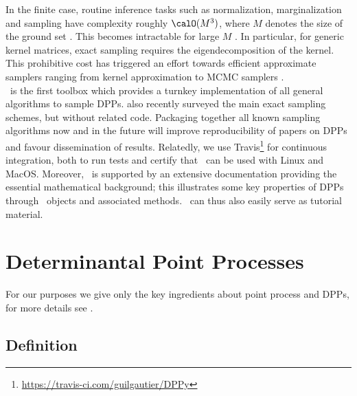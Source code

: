 \documentclass[twoside,11pt]{article}
\begin{document}
  In the finite case, routine inference tasks such as normalization, marginalization and sampling have complexity roughly $\calO(M^3)$, where $M$ denotes the size of the ground set \citep{KuTa12}. This becomes intractable for large $M$ \citep{Gil14}. 
  In particular, for generic kernel matrices, exact sampling requires the eigendecomposition of the kernel. 
  This prohibitive cost has triggered an effort towards efficient approximate samplers ranging from kernel approximation \citep{AKFT13} to MCMC samplers \citep{AnGhRe16, LiJeSr16c, GaBaVa17}.\\

  \DPPy\ is the first toolbox which provides a turnkey implementation of all general algorithms to sample DPPs. \citet{TrBaAm18} also recently surveyed the main exact sampling schemes, but without related code. 
  Packaging together all known sampling algorithms now and in the future will improve reproducibility of papers on DPPs and favour dissemination of results.
  \setcounter{footnote}{5}
  Relatedly, we use Travis\footnote{\url{https://travis-ci.com/guilgautier/DPPy}} for continuous integration, both to run tests and certify that \DPPy\ can be used with Linux and MacOS. 
  Moreover, \DPPy\ is supported by an extensive documentation providing the essential mathematical background; this illustrates some key properties of DPPs through \DPPy\ objects and associated methods.
  \DPPy\ can thus also easily serve as tutorial material.


\section{Determinantal Point Processes} %
\label{sec:determinantal_point_processes}

  For our purposes we give only the key ingredients about point process and DPPs, for more details see \citep{DaVe03, HKPV06}.

  \subsection{Definition} %
  \label{sub:definition}
\end{document}
